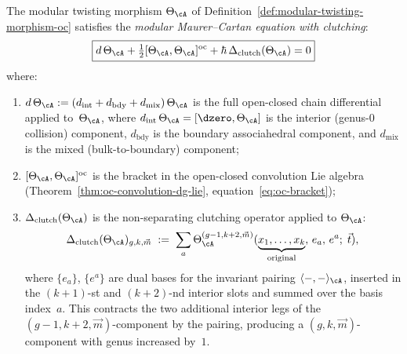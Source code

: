 \begin{theorem}
\label{thm:modular-mc-clutching}
The modular twisting morphism $\Theta_\cA$ of
Definition~\textup{\ref{def:modular-twisting-morphism-oc}}
satisfies the \emph{modular Maurer--Cartan equation with
clutching}:
\begin{equation}\label{eq:modular-mc-clutching}
\boxed{
d\,\Theta_\cA
+ \tfrac{1}{2}[\Theta_\cA, \Theta_\cA]^{\mathrm{oc}}
+ \hbar\,\Delta_{\mathrm{clutch}}(\Theta_\cA)
= 0
}
\end{equation}
where:
\begin{enumerate}[label=\textup{(\roman*)}]
\item $d\,\Theta_\cA := (d_{\mathrm{int}} + d_{\mathrm{bdy}}
  + d_{\mathrm{mix}})\,\Theta_\cA$ is the full open-closed
  chain differential applied to~$\Theta_\cA$, where
  $d_{\mathrm{int}}\,\Theta_\cA = [\dzero, \Theta_\cA]$ is the
  interior (genus-$0$ collision) component,
  $d_{\mathrm{bdy}}$ is the boundary associahedral component, and
  $d_{\mathrm{mix}}$ is the mixed (bulk-to-boundary) component;
\item $[\Theta_\cA, \Theta_\cA]^{\mathrm{oc}}$ is the
  bracket in the open-closed convolution Lie algebra
  \textup{(}Theorem~\textup{\ref{thm:oc-convolution-dg-lie}},
  equation~\eqref{eq:oc-bracket}\textup{)};
\item $\Delta_{\mathrm{clutch}}(\Theta_\cA)$ is the
  non-separating clutching operator applied to $\Theta_\cA$:
  \begin{equation}\label{eq:delta-clutch-def}
  \Delta_{\mathrm{clutch}}(\Theta_\cA)_{g, k, \vec{m}}
  \;:=\;
  \sum_a
  \Theta_\cA^{(g-1, k+2, \vec{m})}
  (\underbrace{x_1, \ldots, x_k}_{\text{original}},\, e_a,\, e^a;\;
  \vec{t}),
  \end{equation}
  where $\{e_a\}$, $\{e^a\}$ are dual bases for the invariant
  pairing $\langle -, - \rangle_\cA$, inserted in the
  $(k{+}1)$-st and $(k{+}2)$-nd interior slots and summed over
  the basis index~$a$.
  This contracts the two additional interior legs of the
  $(g{-}1, k{+}2, \vec{m})$-component by the pairing, producing a
  $(g, k, \vec{m})$-component with genus increased by~$1$.
\end{enumerate}
\end{theorem}

